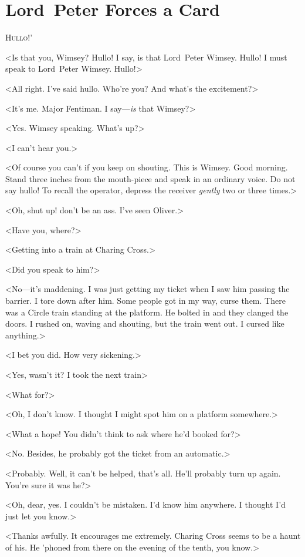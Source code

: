\chapter{Lord~Peter Forces a Card}

\lettrine[ante=‘]{H}{ullo}!' 

\zz
<Is that you, Wimsey? Hullo! I say, is that Lord~Peter Wimsey. Hullo! I must speak to Lord~Peter Wimsey. Hullo!> 

\zz
<All right. I've said hullo. Who're you? And what's the excitement?>

\zz
<It's me. Major Fentiman. I say—\emph{is} that Wimsey?>

<Yes. Wimsey speaking. What's up?>

<I can't hear you.>

<Of course you can't if you keep on shouting. This is Wimsey. Good morning. Stand three inches from the mouth-piece and speak in an ordinary voice. Do not say hullo! To recall the operator, depress the receiver \emph{gently} two or three times.>

<Oh, shut up! don't be an ass. I've seen Oliver.>

<Have you, where?>

<Getting into a train at Charing Cross.>

<Did you speak to him?>

<No—it's maddening. I was just getting my ticket when I saw him passing the barrier. I tore down after him. Some people got in my way, curse them. There was a Circle train standing at the platform. He bolted in and they clanged the doors. I rushed on, waving and shouting, but the train went out. I cursed like anything.>

<I bet you did. How very sickening.>

<Yes, wasn't it? I took the next train\longdash>

<What for?>

<Oh, I don't know. I thought I might spot him on a platform somewhere.>

<What a hope! You didn't think to ask where he'd booked for?>

<No. Besides, he probably got the ticket from an automatic.>

<Probably. Well, it can't be helped, that's all. He'll probably turn up again. You're sure it was he?>

<Oh, dear, yes. I couldn't be mistaken. I'd know him anywhere. I thought I'd just let you know.>

<Thanks awfully. It encourages me extremely. Charing Cross seems to be a haunt of his. He 'phoned from there on the evening of the tenth, you know.>

